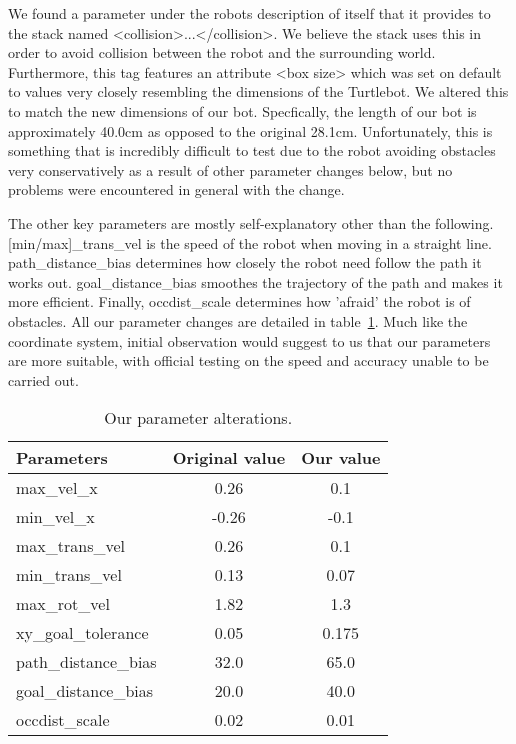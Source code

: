 \documentclass{article}
\begin{document}
We found a parameter under the robots description of itself that it provides to the stack named <collision>...</collision>. We believe the stack uses this in order to avoid collision between the robot and the surrounding world. Furthermore, this tag features an attribute <box size> which was set on default to values very closely resembling the dimensions of the Turtlebot. We altered this to match the new dimensions of our bot. Specfically, the length of our bot is approximately 40.0cm as opposed to the original 28.1cm. Unfortunately, this is something that is incredibly difficult to test due to the robot avoiding obstacles very conservatively as a result of other parameter changes below, but no problems were encountered in general with the change.

The other key parameters are mostly self-explanatory other than the following. [min/max]\_trans\_vel is the speed of the robot when moving in a straight line. path\_distance\_bias determines how closely the robot need follow the path it works out. goal\_distance\_bias smoothes the trajectory of the path and makes it more efficient. Finally, occdist\_scale determines how 'afraid' the robot is of obstacles. All our parameter changes are detailed in table~\ref{tab:params}. Much like the coordinate system, initial observation would suggest to us that our parameters are more suitable, with official testing on the speed and accuracy unable to be carried out.

\begin{table}[h]
\vskip 3mm
\begin{center}
\begin{small}
\begin{sc}
\begin{tabular}{lcc}
\hline
\abovespace\belowspace
Parameters & Original value & Our value \\
\hline
  max\_vel\_x & 0.26 & 0.1 \\
  min\_vel\_x & -0.26 & -0.1 \\
  max\_trans\_vel & 0.26 & 0.1 \\
  min\_trans\_vel & 0.13 & 0.07 \\
  max\_rot\_vel & 1.82 & 1.3 \\
  xy\_goal\_tolerance & 0.05 & 0.175 \\
  path\_distance\_bias & 32.0 & 65.0 \\
  goal\_distance\_bias & 20.0 & 40.0 \\
  occdist\_scale & 0.02 & 0.01
\end{tabular}
\end{sc}
\end{small}
\caption{Our parameter alterations.}
\label{tab:params}
\end{center}
\vskip -3mm
\end{table}
\end{document}
